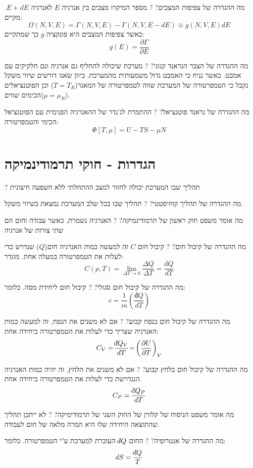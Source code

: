 \documentclass{tstextbook}
\begin{document}
מה ההגדרה של צפיפות המצבים?
?
מספר המיקרו מצבים בין אנרגיה \(E\) לאנרגיה \(E+dE\). מקיים:
$$\Omega\left(N,V,E\right)=\Gamma\left(N,V,E\right)-\Gamma\left(N,V,E-d E\right)\equiv g\left(N,V,E\right)d E$$
כאשר צפיפות המצבים היא פונקציה \(g\) כך שמתקיים:
$$g(E)=\frac{\partial \Gamma}{\partial E} $$

מה ההגדרה של הצבר הגראנד קנוני?
?
מערכת שיכולה להחליף גם אנרגיה וגם חלקיקים עם אמבט. כאשר נניח כי האמבט גדול משמעותית מהמערכת. כיוון שאנו דורשים שיווי משקל נקבל כי הטמפרטורה של המערכת שווה לטמפרטורה של המאגר(\(T=T_{R}\)) וכן הפוטנציאלים הכימים שווים(\(\mu=\mu_{R}\)).

מה ההגדרה של גראנד פוטנציאל?
?
ההתמרת לג'נדר של ההאנרגיה הפנימית עם הפוטנציאל הכימי והטמפרטורה:
$$\Phi[T,\mu]=U-T S-\mu N$$

\section{הגדרות - חוקי תרמודינמיקה}

?
תהליך שבו המערכת יכולה לחזור למצב ההתחלתי ללא השפעה חיצונית

מה ההגדרה של תהליך קווזיסטטי?
?
תהליך שבו בכל שלב המערכת נמצאת בשיווי משקל.

מה אומר משפט חוק ראשון של תרמודינמיקה?
?
האנרגיה נשמרת, כאשר עבודה וחום הם שתי צורות של אנרגיה

מה ההגדרה של קיבול חום?
?
קיבול חום \(C\) זה למעשה כמות האנרגיה חום(\(Q\)) שנדרש כדי לעלות את הטמפרטורה במעלה אחת. מוגדר:
$$C(p,T)=\operatorname*{lim}_{\Delta T\rightarrow0}\frac{\Delta Q}{\Delta T}=\frac{\mathrm{d}Q}{d T}$$

מה ההגדרה של קיבול חום סגולי?
?
קיבול חום ליחידת מסה. כלומר:
$$c=\frac{1}{m}\left( \frac{ đ Q}{d T} \right)$$

מה ההגדרה של קיבול חום בנפח קבוע?
?
אם לא משנים את הנפח, זה למעשה כמות האנרגיה שצריך כדי לעלות את הטמפרטורה ביחידה אחת:
$$C_{V}=\!\frac{\;\bar{}\mkern-7.5mu dQ_{V}}{d T}\!=\!\left(\frac{\partial U}{\partial T}\right)_{V}$$

מה ההגדרה של קיבול חום בלחץ קבוע?
?
אם לא משנים את הלחץ, זה יהיה כמות האנרגיה הנגדרשת כדי לעלות את הטמפרטורה ביחידה אחת.
$$C_{P}={\frac{\mathrm{\;\bar{}\mkern-7.5mu d}Q_{P}}{d T}}$$

מה אומר משפט הניסוח של קלווין של החוק השני של תרמודימיקה?
?
לא ייתכן תהליך שהתוצאה היחידה שלו היא המרה מלאה של חום לעבודה.

מה ההגדרה של אנטרופיה?
?
החום \(\;\bar{}\mkern-7.5mu dQ\) העוברת למערכת ע"י הטמפרטורה. כלומר:
$$dS = \frac{\;\bar{}\mkern-7.5mu dQ}{T}$$
\end{document}
